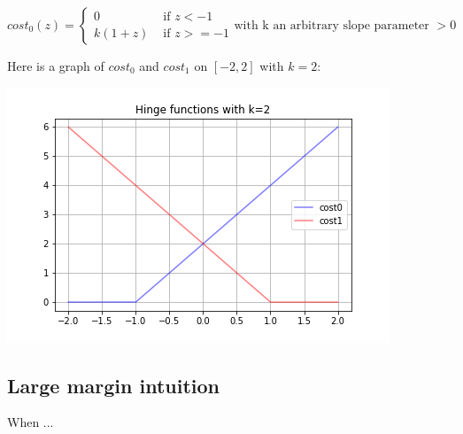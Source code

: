 \documentclass[a4paper, 12pt]{article}
\begin{document}
\begin{equation}
cost_0(z) = 
\begin{cases}
0 & \text{ if } z < -1 \\
k(1+z) &  \text{ if } z>=-1
\end{cases}
\text{with k an arbitrary slope parameter } >0
\end{equation}

Here is a graph of $cost_0$ and $cost_1$ on $[-2,2]$ with $k=2$:

\begin{center}
  \includegraphics[scale=0.7]{hinge}
  \label{fig:hinge}
\end{center}


\subsection{Large margin intuition}
 
When ...
\end{document}
